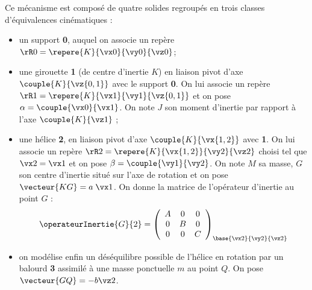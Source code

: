 \documentclass[12pt]{article}
\begin{document}
Ce mécanisme est composé de quatre solides regroupés en  trois classes d'équivalences cinématiques :

\begin{itemize}
\item un support \textbf{0}, auquel on associe un repère $\rR0=\repere{K}{\vx0}{\vy0}{\vz0}$;
\item une girouette \textbf{1} (de centre d'inertie $K$) en liaison pivot d'axe $\couple{K}{\vz{0,1}}$ avec le support \textbf{0}. On lui associe un repère $\rR1=\repere{K}{\vx1}{\vy1}{\vz{0,1}}$ et on pose $\alpha=\couple{\vx0}{\vx1}$. On note $J$ son moment d'inertie par rapport à l'axe $\couple{K}{\vz1}$ ; %
\item une hélice \textbf{2}, en liaison pivot d'axe $\couple{K}{\vx{1,2}}$  avec \textbf{1}. On lui associe un repère $\rR2=\repere{K}{\vx{1,2}}{\vy2}{\vz2}$  choisi tel que $\vx2=\vx1$ et on pose $\beta=\couple{\vy1}{\vy2}$.
On note $M$ sa masse, $G$ son centre d'inertie situé sur l'axe de rotation et on pose $\vecteur{KG}=a\;\vx1$. On donne la matrice de l'opérateur d'inertie au point $G$ :
\begin{align*}
\operateurInertie{G}{2}=
\left(
\begin{array}{ccc}
A & 0 & 0 \\ 
0 & B & 0 \\ 
0 & 0 & C
\end{array}
\right)_{\base{\vx2}{\vy2}{\vz2}}
\end{align*}
\item on modélise enfin un déséquilibre possible de l'hélice en rotation par un balourd \textbf{3} assimilé à une masse ponctuelle $m$ au point $Q$. On pose $\vecteur{GQ}=-b\vz2$.
\end{itemize}
\end{document}
